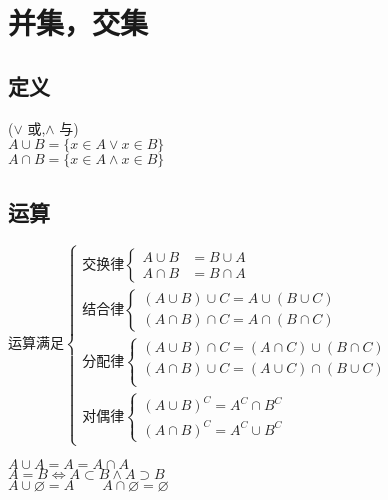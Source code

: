 \section{并集，交集}
\subsection{定义}
\begin{center}
    (\(\vee\) 或,\(\land\) 与) \\
$A\cup B=\{x\in A\vee x\in B\}$ \\
$A\cap B=\{x\in A\land x\in B\}$
\end{center}
\subsection{运算}

运算满足$\begin{cases}
    \mbox{交换律} \begin{cases}
        A\cup B&= B\cup A  \\
        A\cap B&= B\cap A
    \end{cases} \\
    \mbox{结合律}\begin{cases}
        (A\cup B)\cup C = A\cup(B\cup C) \\
        (A\cap B)\cap C = A\cap(B\cap C)
    \end{cases} \\
    \mbox{分配律}\begin{cases}
        (A\cup B)\cap C = (A\cap C)\cup (B \cap C) \\
        (A\cap B)\cup C = (A\cup C)\cap (B \cup C) \\
    \end{cases}\\
    \mbox{对偶律}\begin{cases}
        (A\cup B)^C = A^C\cap B^C \\
        (A\cap B)^C = A^C\cup B^C
    \end{cases}
\end{cases}$
\begin{center}
    $A\cup A= A = A\cap A $\\
    $A = B \Leftrightarrow A\subset B\land A\supset B$  \\
    $A\cup\varnothing = A {\qquad}A\cap\varnothing = \varnothing $
\end{center}


